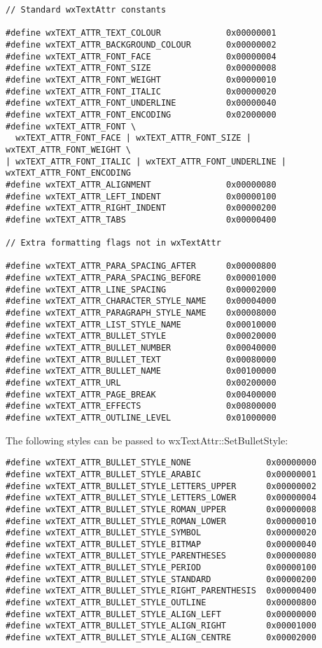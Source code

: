 {\small
\begin{verbatim}
// Standard wxTextAttr constants

#define wxTEXT_ATTR_TEXT_COLOUR             0x00000001
#define wxTEXT_ATTR_BACKGROUND_COLOUR       0x00000002
#define wxTEXT_ATTR_FONT_FACE               0x00000004
#define wxTEXT_ATTR_FONT_SIZE               0x00000008
#define wxTEXT_ATTR_FONT_WEIGHT             0x00000010
#define wxTEXT_ATTR_FONT_ITALIC             0x00000020
#define wxTEXT_ATTR_FONT_UNDERLINE          0x00000040
#define wxTEXT_ATTR_FONT_ENCODING           0x02000000
#define wxTEXT_ATTR_FONT \
  wxTEXT_ATTR_FONT_FACE | wxTEXT_ATTR_FONT_SIZE | wxTEXT_ATTR_FONT_WEIGHT \
| wxTEXT_ATTR_FONT_ITALIC | wxTEXT_ATTR_FONT_UNDERLINE | wxTEXT_ATTR_FONT_ENCODING
#define wxTEXT_ATTR_ALIGNMENT               0x00000080
#define wxTEXT_ATTR_LEFT_INDENT             0x00000100
#define wxTEXT_ATTR_RIGHT_INDENT            0x00000200
#define wxTEXT_ATTR_TABS                    0x00000400

// Extra formatting flags not in wxTextAttr

#define wxTEXT_ATTR_PARA_SPACING_AFTER      0x00000800
#define wxTEXT_ATTR_PARA_SPACING_BEFORE     0x00001000
#define wxTEXT_ATTR_LINE_SPACING            0x00002000
#define wxTEXT_ATTR_CHARACTER_STYLE_NAME    0x00004000
#define wxTEXT_ATTR_PARAGRAPH_STYLE_NAME    0x00008000
#define wxTEXT_ATTR_LIST_STYLE_NAME         0x00010000
#define wxTEXT_ATTR_BULLET_STYLE            0x00020000
#define wxTEXT_ATTR_BULLET_NUMBER           0x00040000
#define wxTEXT_ATTR_BULLET_TEXT             0x00080000
#define wxTEXT_ATTR_BULLET_NAME             0x00100000
#define wxTEXT_ATTR_URL                     0x00200000
#define wxTEXT_ATTR_PAGE_BREAK              0x00400000
#define wxTEXT_ATTR_EFFECTS                 0x00800000
#define wxTEXT_ATTR_OUTLINE_LEVEL           0x01000000
\end{verbatim}
}

The following styles can be passed to wxTextAttr::SetBulletStyle:

{\small
\begin{verbatim}
#define wxTEXT_ATTR_BULLET_STYLE_NONE               0x00000000
#define wxTEXT_ATTR_BULLET_STYLE_ARABIC             0x00000001
#define wxTEXT_ATTR_BULLET_STYLE_LETTERS_UPPER      0x00000002
#define wxTEXT_ATTR_BULLET_STYLE_LETTERS_LOWER      0x00000004
#define wxTEXT_ATTR_BULLET_STYLE_ROMAN_UPPER        0x00000008
#define wxTEXT_ATTR_BULLET_STYLE_ROMAN_LOWER        0x00000010
#define wxTEXT_ATTR_BULLET_STYLE_SYMBOL             0x00000020
#define wxTEXT_ATTR_BULLET_STYLE_BITMAP             0x00000040
#define wxTEXT_ATTR_BULLET_STYLE_PARENTHESES        0x00000080
#define wxTEXT_ATTR_BULLET_STYLE_PERIOD             0x00000100
#define wxTEXT_ATTR_BULLET_STYLE_STANDARD           0x00000200
#define wxTEXT_ATTR_BULLET_STYLE_RIGHT_PARENTHESIS  0x00000400
#define wxTEXT_ATTR_BULLET_STYLE_OUTLINE            0x00000800
#define wxTEXT_ATTR_BULLET_STYLE_ALIGN_LEFT         0x00000000
#define wxTEXT_ATTR_BULLET_STYLE_ALIGN_RIGHT        0x00001000
#define wxTEXT_ATTR_BULLET_STYLE_ALIGN_CENTRE       0x00002000
\end{verbatim}
}

